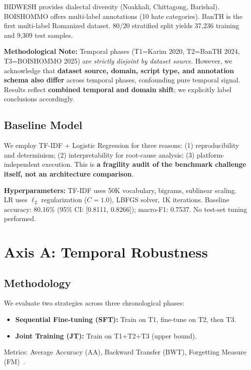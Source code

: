 \documentclass[conference]{IEEEtran}
\begin{document}
BIDWESH provides dialectal diversity (Noakhali, Chittagong, Barishal). BOISHOMMO offers multi-label annotations (10 hate categories). BanTH is the first multi-label Romanized dataset. 80/20 stratified split yields 37,236 training and 9,309 test samples.

\textbf{Methodological Note:} Temporal phases (T1=Karim 2020, T2=BanTH 2024, T3=BOISHOMMO 2025) are \textit{strictly disjoint by dataset source}. However, we acknowledge that \textbf{dataset source, domain, script type, and annotation schema also differ} across temporal phases, confounding pure temporal signal. Results reflect \textbf{combined temporal and domain shift}; we explicitly label conclusions accordingly.

\subsection{Baseline Model}

We employ TF-IDF + Logistic Regression for three reasons: (1) reproducibility and determinism; (2) interpretability for root-cause analysis; (3) platform-independent execution. This is \textbf{a fragility audit of the benchmark challenge itself, not an architecture comparison}. 

\textbf{Hyperparameters:} TF-IDF uses 50K vocabulary, bigrams, sublinear scaling. LR uses $\ell_2$ regularization ($C=1.0$), LBFGS solver, 1K iterations. Baseline accuracy: 80.16\% (95\% CI: [0.8111, 0.8266]); macro-F1: 0.7537. No test-set tuning performed.

\section{Axis A: Temporal Robustness}

\subsection{Methodology}

We evaluate two strategies across three chronological phases:
\begin{itemize}
\item \textbf{Sequential Fine-tuning (SFT):} Train on T1, fine-tune on T2, then T3.
\item \textbf{Joint Training (JT):} Train on T1+T2+T3 (upper bound).
\end{itemize}

Metrics: Average Accuracy (AA), Backward Transfer (BWT), Forgetting Measure (FM)~\cite{lopez2017gradient}.
\end{document}
